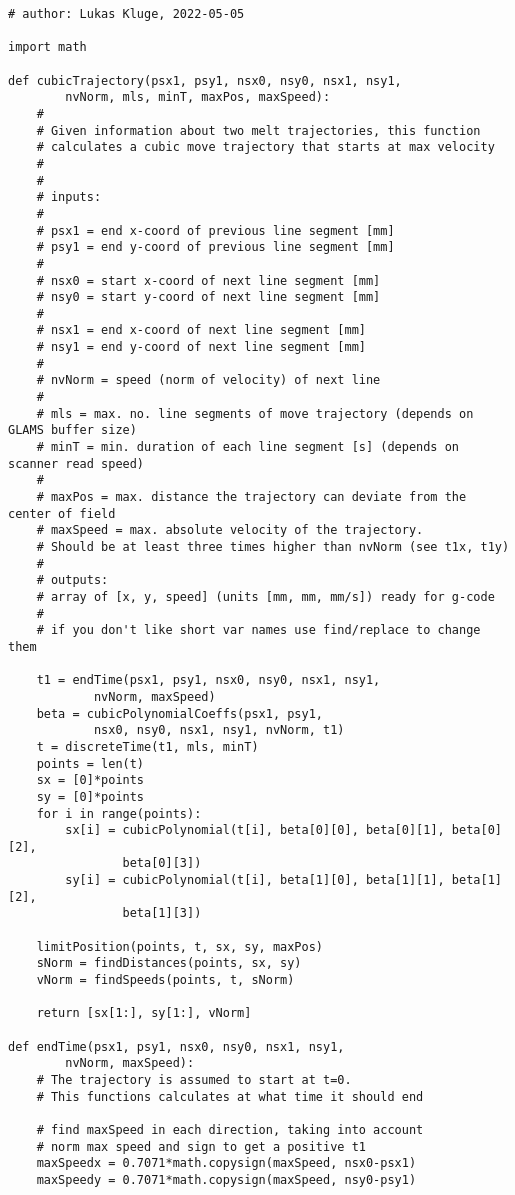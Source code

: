 \begin{verbatim}
# author: Lukas Kluge, 2022-05-05

import math

def cubicTrajectory(psx1, psy1, nsx0, nsy0, nsx1, nsy1,
        nvNorm, mls, minT, maxPos, maxSpeed):
    #
    # Given information about two melt trajectories, this function
    # calculates a cubic move trajectory that starts at max velocity
    #
    #
    # inputs:
    #
    # psx1 = end x-coord of previous line segment [mm]
    # psy1 = end y-coord of previous line segment [mm]
    #
    # nsx0 = start x-coord of next line segment [mm]
    # nsy0 = start y-coord of next line segment [mm]
    #
    # nsx1 = end x-coord of next line segment [mm]
    # nsy1 = end y-coord of next line segment [mm]
    #
    # nvNorm = speed (norm of velocity) of next line
    #
    # mls = max. no. line segments of move trajectory (depends on GLAMS buffer size)
    # minT = min. duration of each line segment [s] (depends on scanner read speed)
    # 
    # maxPos = max. distance the trajectory can deviate from the center of field
    # maxSpeed = max. absolute velocity of the trajectory.
    # Should be at least three times higher than nvNorm (see t1x, t1y)
    #
    # outputs:
    # array of [x, y, speed] (units [mm, mm, mm/s]) ready for g-code
    #
    # if you don't like short var names use find/replace to change them

    t1 = endTime(psx1, psy1, nsx0, nsy0, nsx1, nsy1,
            nvNorm, maxSpeed)
    beta = cubicPolynomialCoeffs(psx1, psy1,
            nsx0, nsy0, nsx1, nsy1, nvNorm, t1)
    t = discreteTime(t1, mls, minT)
    points = len(t)
    sx = [0]*points
    sy = [0]*points
    for i in range(points):
        sx[i] = cubicPolynomial(t[i], beta[0][0], beta[0][1], beta[0][2],
                beta[0][3])
        sy[i] = cubicPolynomial(t[i], beta[1][0], beta[1][1], beta[1][2],
                beta[1][3])

    limitPosition(points, t, sx, sy, maxPos)
    sNorm = findDistances(points, sx, sy)
    vNorm = findSpeeds(points, t, sNorm)

    return [sx[1:], sy[1:], vNorm]

def endTime(psx1, psy1, nsx0, nsy0, nsx1, nsy1,
        nvNorm, maxSpeed):
    # The trajectory is assumed to start at t=0.
    # This functions calculates at what time it should end

    # find maxSpeed in each direction, taking into account
    # norm max speed and sign to get a positive t1
    maxSpeedx = 0.7071*math.copysign(maxSpeed, nsx0-psx1)
    maxSpeedy = 0.7071*math.copysign(maxSpeed, nsy0-psy1)
    

\end{verbatim}
